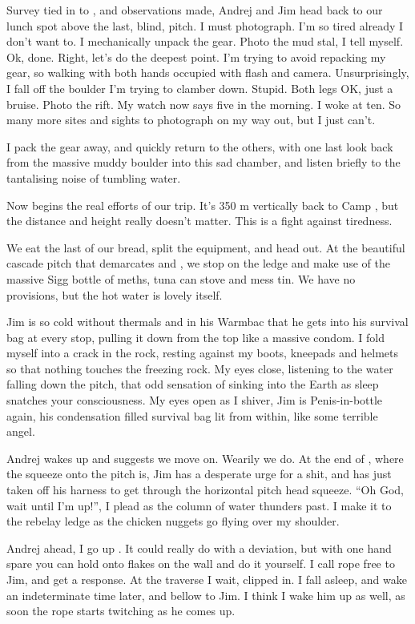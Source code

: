Survey tied in to , and observations made, Andrej
and Jim head back to our lunch spot above the last, blind, pitch. I must
photograph. I'm so tired already I don't want to. I mechanically unpack
the gear. Photo the mud stal, I tell myself. Ok, done. Right, let's do
the deepest point. I'm trying to avoid repacking my gear, so walking
with both hands occupied with flash and camera. Unsurprisingly, I fall
off the boulder I'm trying to clamber down. Stupid. Both legs OK, just a
bruise. Photo the rift. My watch now says five in the morning. I woke at
ten. So many more sites and sights to photograph on my way out, but I
just can't.

I pack the gear away, and quickly return to the others, with one last
look back from the massive muddy boulder into this sad chamber, and
listen briefly to the tantalising noise of tumbling water.

Now begins the real efforts of our trip. It's 350 m vertically back to
Camp , but the distance and height really doesn't matter.
This is a fight against tiredness.

We eat the last of our bread, split the equipment, and head out. At the
beautiful cascade pitch that demarcates  and , we stop on
the ledge and make use of the massive Sigg bottle of meths, tuna can
stove and mess tin. We have no provisions, but the hot water is lovely
itself.

Jim is so cold without thermals and in his Warmbac that he gets into his
survival bag at every stop, pulling it down from the top like a massive
condom. I fold myself into a crack in the rock, resting against my
boots, kneepads and helmets so that nothing touches the freezing rock.
My eyes close, listening to the water falling down the pitch, that odd
sensation of sinking into the Earth as sleep snatches your
consciousness. My eyes open as I shiver, Jim is Penis-in-bottle again,
his condensation filled survival bag lit from within, like some terrible
angel.

Andrej wakes up and suggests we move on. Wearily we do. At the end of
, where the squeeze onto the pitch is, Jim has a desperate urge for
a shit, and has just taken off his harness to get through the horizontal
pitch head squeeze. ``Oh God, wait until I'm up!'', I plead as the
column of water thunders past. I make it to the rebelay ledge as the
chicken nuggets go flying over my shoulder.

Andrej ahead, I go up . It could really do with a
deviation, but with one hand spare you can hold onto flakes on the wall
and do it yourself. I call rope free to Jim, and get a response. At the
traverse I wait, clipped in. I fall asleep, and wake an indeterminate
time later, and bellow to Jim. I think I wake him up as well, as soon
the rope starts twitching as he comes up.

